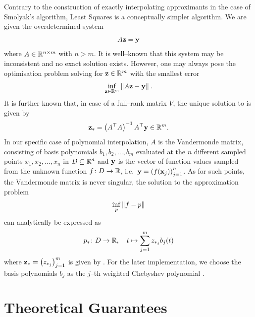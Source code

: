 \documentclass[12pt, oneside]{amsart}
\theoremstyle{definition}
\theoremstyle{remark}
\numberwithin{equation}{section}
\begin{document}
Contrary to the construction of exactly interpolating approximants in the case 
of Smolyak's algorithm, Least Squares is a conceptually simpler algorithm. We 
are given the overdetermined system \[
    A\bfz = \bfy
\]
where \(A \in \R^{n \times m}\) with \(n > m\). It is well--known that this system may be inconsistent and no exact solution exists. However, one may always pose the optimisation problem solving for \(\bfz \in \R^{m}\) with the smallest error
\begin{equation}\label{eq:leastSquares}
    \inf_{\bfz \in \R^{m}} \norm[]{A\bfz - \bfy}.
\end{equation}
It is further known that, in case of a full--rank matrix \(V\), the unique 
solution to  is given by 
\begin{equation}\label{eq:ls_solution_moore_penrose_inverse}
	\bfz_* = \left(A^\top A\right)^{-1} A^\top \bfy \in \R^m.
\end{equation}
In our specific case of polynomial interpolation, \(A\) is the Vandermonde 
matrix, consisting of basis polynomials \(b_1, b_2, \dots, b_m\) evaluated at 
the $n$ different sampled points \(x_1, x_2, \dots, x_n\) in \(D \subseteq 
\R^d\) and \(\bfy\) is the vector of function values sampled from the unknown 
function \(f\from D \to \R\), i.e.\ \(\bfy = \left(f(\bfx_j)\right)_{j=1}^n\). 
As for such points, the Vandermonde matrix is never singular, the solution to 
the approximation problem \[
    \inf_{p} \norm[]{f-p}
\]
can analytically be expressed as \[
    p_* \from D \to \R,\quad t \mapsto \sum_{j=1}^m z_{*_{j}} b_j(t)
\]
where \(\bfz_* = \left(z_{*_j}\right)_{j=1}^m\) is given by 
.
For the later implementation, we choose the basis polynomials \(b_j\) as the \(j\)--th weighted Chebyshev polynomial .

\section{Theoretical Guarantees}

\end{document}
